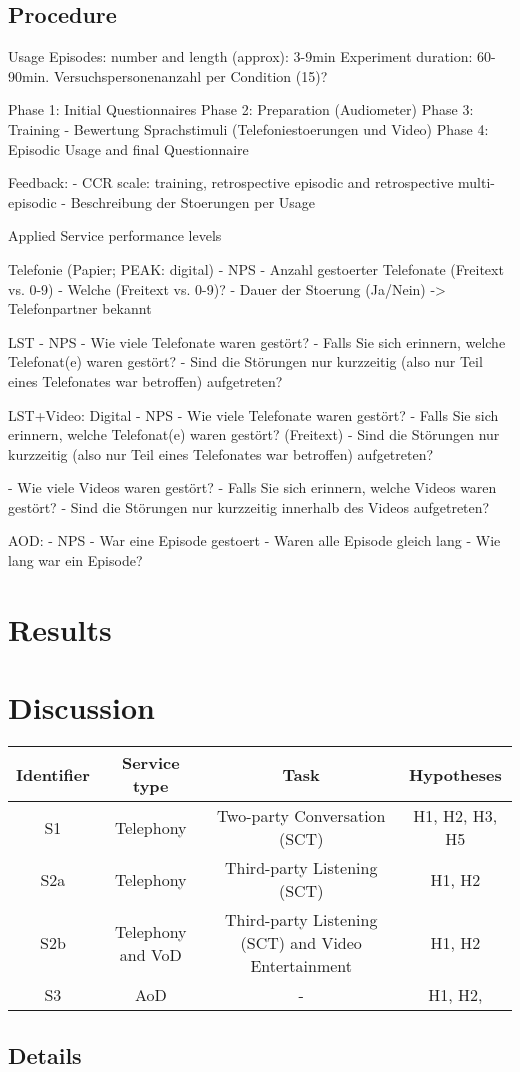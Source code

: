 \subsection{Procedure} %

Usage Episodes: number and length (approx): 3-9min
Experiment duration: 60-90min.
Versuchspersonenanzahl per Condition (15)?

Phase 1: Initial Questionnaires
Phase 2: Preparation (Audiometer)
Phase 3: Training - Bewertung Sprachstimuli (Telefoniestoerungen und Video)
Phase 4: Episodic Usage and final Questionnaire

Feedback:
- CCR scale: training, retrospective episodic and retrospective multi-episodic 
- Beschreibung der Stoerungen per Usage

Applied Service performance levels

Telefonie (Papier; PEAK: digital)
- NPS
- Anzahl gestoerter Telefonate (Freitext vs. 0-9)
- Welche (Freitext vs. 0-9)?
- Dauer der Stoerung (Ja/Nein)
-> Telefonpartner bekannt

LST
- NPS
- Wie viele Telefonate waren gestört?
- Falls Sie sich erinnern, welche Telefonat(e) waren gestört?
- Sind die Störungen nur kurzzeitig (also nur Teil eines Telefonates war betroffen) aufgetreten?

LST+Video: Digital
- NPS
- Wie viele Telefonate waren gestört? 
- Falls Sie sich erinnern, welche Telefonat(e) waren gestört? (Freitext)
- Sind die Störungen nur kurzzeitig (also nur Teil eines Telefonates war betroffen) aufgetreten?

- Wie viele Videos waren gestört?
- Falls Sie sich erinnern, welche Videos waren gestört?
- Sind die Störungen nur kurzzeitig innerhalb des Videos aufgetreten?

AOD:
- NPS
- War eine Episode gestoert
- Waren alle Episode gleich lang
- Wie lang war ein Episode?

\section{Results}
\section{Discussion}
\begin{table}[h]
	\begin{tabular}{|c|c|c|c|}
	Identifier	& Service type 			& Task 									& Hypotheses \\
	\hline
	S1			& Telephony				& Two-party Conversation (\ac{SCT})	& H1, H2, H3, H5 \\
	S2a			& Telephony				& Third-party Listening	(\ac{SCT})		& H1, H2 \\ 
	S2b			& Telephony and \ac{VoD}& Third-party Listening	(\ac{SCT}) and Video Entertainment & H1, H2 \\  %
	S3			& \ac{AoD}				& -										& H1, H2,
	\end{tabular}
\end{table}

\subsection{Details}

